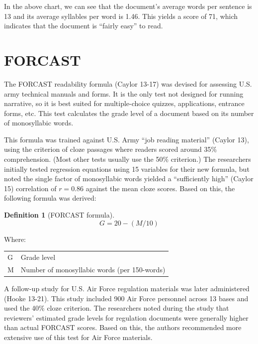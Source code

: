 \documentclass[
]{book}
\theoremstyle{definition}
\newtheorem{definition}{Definition}[chapter]
\theoremstyle{definition}
\theoremstyle{definition}
\theoremstyle{definition}
\theoremstyle{remark}
\begin{document}
In the above chart, we can see that the document's average words per sentence is 13 and its average syllables per word is 1.46. This yields a score of 71, which indicates that the document is ``fairly easy'' to read.

\newpage

\hypertarget{forcast-test}{%
\section{\texorpdfstring{FORCAST}{FORCAST}}\label{forcast-test}}

The FORCAST readability formula (Caylor 13-17) was devised for assessing U.S. army technical manuals and forms. It is the only test not designed for running narrative, so it is best suited for multiple-choice quizzes, applications, entrance forms, etc. This test calculates the grade level of a document based on its number of monosyllabic words.

This formula was trained against U.S. Army ``job reading material'' (Caylor 13), using the criterion of cloze passages where readers scored around 35\% comprehension. (Most other tests usually use the 50\% criterion.) The researchers initially tested regression equations using 15 variables for their new formula, but noted the single factor of monosyllabic words yielded a ``sufficiently high'' (Caylor 15) correlation of \(r = 0.86\) against the mean cloze scores. Based on this, the following formula was derived:

\begin{definition}[FORCAST formula]
\protect\hypertarget{def:forcast}{}{\label{def:forcast} {} }\[
G = 20-(M/10)
\]
\end{definition}

Where:

\begin{longtable}[]{@{}
  >{\raggedright\arraybackslash}p{}
  >{\raggedright\arraybackslash}p{}@{}}
\toprule
\endhead
G & Grade level \\
M & Number of monosyllabic words (per 150-words) \\
\bottomrule
\end{longtable}

A follow-up study for U.S. Air Force regulation materials was later administered (Hooke 13-21). This study included 900 Air Force personnel across 13 bases and used the 40\% cloze criterion. The researchers noted during the study that reviewers' estimated grade levels for regulation documents were generally higher than actual FORCAST scores. Based on this, the authors recommended more extensive use of this test for Air Force materials.
\end{document}
